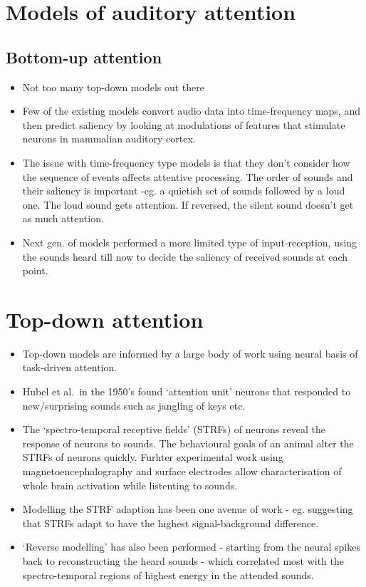 \documentclass[
]{book}
\providecommand{\tightlist}{%
  \setlength{\itemsep}{0pt}\setlength{\parskip}{0pt}}
\begin{document}
\hypertarget{models-of-auditory-attention}{%
\section{Models of auditory attention}\label{models-of-auditory-attention}}

\hypertarget{bottom-up-attention}{%
\subsection{Bottom-up attention}\label{bottom-up-attention}}

\begin{itemize}
\tightlist
\item
  Not too many top-down models out there
\item
  Few of the existing models convert audio data into time-frequency maps, and then predict saliency by looking at modulations of features that stimulate neurons in mammalian auditory cortex.
\item
  The issue with time-frequency type models is that they don't consider how the sequence of events affects attentive processing. The order of sounds and their saliency is important -eg. a quietish set of sounds followed by a loud one. The loud sound gets attention. If reversed, the silent sound doesn't get as much attention.
\item
  Next gen. of models performed a more limited type of input-reception, using the sounds heard till now to decide the saliency of received sounds at each point.
\end{itemize}

\hypertarget{top-down-attention}{%
\section{Top-down attention}\label{top-down-attention}}

\begin{itemize}
\tightlist
\item
  Top-down models are informed by a large body of work using neural basis of task-driven attention.
\item
  Hubel et al.~in the 1950's found `attention unit' neurons that responded to new/surprising sounds such as jangling of keys etc.
\item
  The `spectro-temporal receptive fields' (STRFs) of neurons reveal the response of neurons to sounds. The behavioural goals of an animal alter the STRFs of neurons quickly. Furhter experimental work using magnetoencephalography and surface electrodes allow characterisation of whole brain activation while listenting to sounds.
\item
  Modelling the STRF adaption has been one avenue of work - eg. suggesting that STRFs adapt to have the highest signal-background difference.
\item
  `Reverse modelling' has also been performed - starting from the neural spikes back to reconstructing the heard sounds - which correlated most with the spectro-temporal regions of highest energy in the attended sounds.
\end{itemize}
\end{document}
